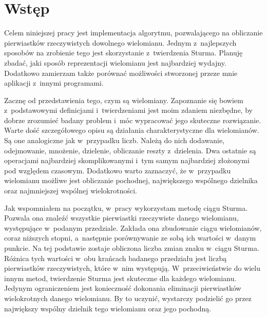 \chapter{Wstęp}

Celem niniejszej pracy jest implementacja algorytmu, pozwalającego na obliczanie pierwiastków rzeczywistych dowolnego wielomianu. Jednym z~najlepszych sposobów na zrobienie tego jest skorzystanie z~twierdzenia Sturma. Planuję zbadać, jaki sposób reprezentacji wielomianu jest najbardziej wydajny. Dodatkowo zamierzam także porównać możliwości stworzonej przeze mnie aplikacji z~innymi programami.

Zacznę od przedstawienia tego, czym są wielomiany. Zapoznanie się bowiem z~podstawowymi definicjami i~twierdzeniami jest moim zdaniem niezbędne, by dobrze zrozumieć badany problem i~móc wypracować jego skuteczne rozwiązanie. Warte dość szczegółowego opisu są działania charakterystyczne dla wielomianów. Są one analogiczne jak w~przypadku liczb. Należą do nich dodawanie, odejmowanie, mnożenie, dzielenie, obliczanie reszty z~dzielenia. Dwa ostatnie są operacjami najbardziej skomplikowanymi i~tym samym najbardziej złożonymi pod względem czasowym. Dodatkowo warto zaznaczyć, że w~przypadku wielomianu możliwe jest obliczanie pochodnej, największego wspólnego dzielnika oraz najmniejszej wspólnej wielokrotności.

Jak wspomniałem na początku, w~pracy wykorzystam metodę ciągu Sturma. Pozwala ona znaleźć wszystkie pierwiastki rzeczywiste danego wielomianu, występujące w~podanym przedziale. Zakłada ona zbudowanie ciągu wielomianów, coraz niższych stopni, a~następnie porównywanie ze sobą ich wartości w~danym punkcie. Na tej podstawie zostaje obliczona liczba zmian znaku w~ciągu Sturma. Różnica tych wartości w~obu krańcach badanego przedziału jest liczbą pierwiastków rzeczywistych, które w~nim występują. W~przeciwieństwie do wielu innym metod, twierdzenie Sturma jest skuteczne dla każdego wielomianu. Jedynym ograniczeniem jest konieczność dokonania eliminacji pierwiastków wielokrotnych danego wielomianu. By to uczynić, wystarczy podzielić go przez największy wspólny dzielnik tego wielomianu oraz jego pochodną.

